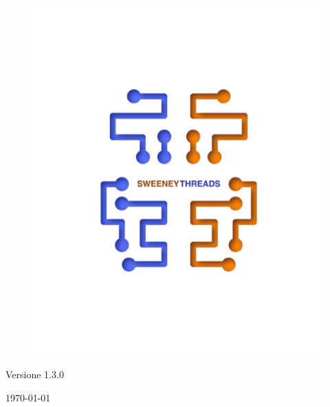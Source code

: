 \documentclass[a4paper]{article}
\begin{document}
\begin{titlepage}
		\begin{figure}[H]
		\centering
			\includegraphics[scale=0.8]{sweeney.png}
		\end{figure}
		\begin{center}
			Versione 1.3.0
		\end{center}
		{\large \today}\\[3cm] 
		\vfill  
	\end{titlepage}
	
	
	
\end{document}
